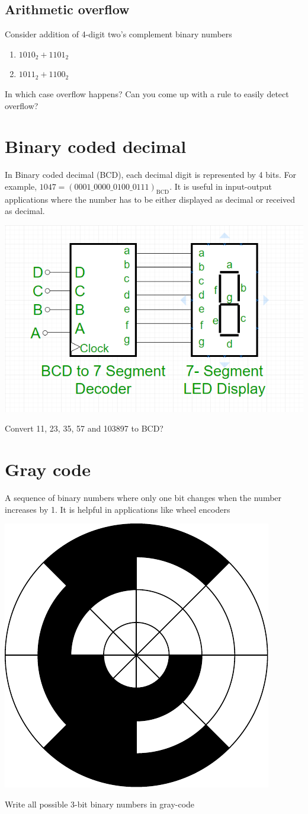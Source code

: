 \subsection{Arithmetic overflow}
\begin{prob}
  Consider addition of 4-digit two's complement binary numbers
  \begin{enumerate}
  \item $1010_2 + 1101_2$
  \item $1011_2 + 1100_2$
  \end{enumerate}
  In which case overflow happens? Can you come up with a rule to easily detect overflow?
\end{prob}
\vspace{20em}

\section{Binary coded decimal}
In Binary coded decimal (BCD), each decimal digit is represented by 4 bits. For
example, $1047 = (0001\_0000\_0100\_0111)_{\text{BCD}}$. It is useful in
input-output applications where the number has to be either displayed as decimal
or received as decimal.

\includegraphics[width=0.5\linewidth]{bcdto7seg.png}

\begin{prob}
  Convert 11, 23, 35, 57 and 103897 to BCD?
\end{prob}
\vspace{10em}

\section{Gray code}
A sequence of binary numbers where only one bit changes when the number
increases by 1. It is helpful in applications like wheel encoders

\includegraphics[width=0.5\linewidth]{gray-code.pdf}

\begin{prob}
  Write all possible 3-bit binary numbers in gray-code
\end{prob}
\vspace{10em}